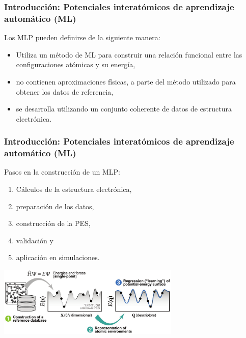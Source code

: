 \documentclass[aspectratio=169]{beamer}
\begin{document}
    \begin{frame}
        \frametitle{Introducción: Potenciales interatómicos de aprendizaje 
        automático (ML)}

        Los MLP pueden definirse de la siguiente manera:
        \begin{itemize}
            \item Utiliza un método de ML para construir una relación funcional
                entre las configuraciones atómicas y su energía,
            \item no contienen aproximaciones físicas, a parte del método 
                utilizado para obtener los datos de referencia,
            \item se desarrolla utilizando un conjunto coherente de datos de
                estructura electrónica.
        \end{itemize}

    \end{frame}

    \begin{frame}
        \frametitle{Introducción: Potenciales interatómicos de aprendizaje 
        automático (ML)}

        Pasos en la construcción de un MLP:
        \begin{enumerate}
            \item Cálculos de la estructura electrónica,
            \item preparación de los datos,
            \item construcción de la PES,
            \item validación y
            \item aplicación en simulaciones.
        \end{enumerate}

        \begin{center}
            \includegraphics[width=0.65\textwidth]{intro-construccion.png}
        \end{center}

	\end{frame}
    
\end{document}
